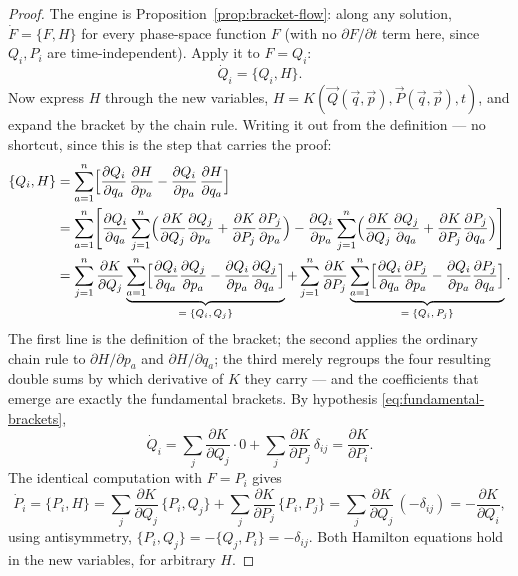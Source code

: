 \documentclass[11pt]{article}
\theoremstyle{plain}
\theoremstyle{definition}
\theoremstyle{remark}
\newcommand{\pd}[2]{\frac{\partial #1}{\partial #2}}
\newcommand{\vq}{\vec{q}}
\newcommand{\vp}{\vec{p}}
\newcommand{\vQ}{\vec{Q}}
\newcommand{\vP}{\vec{P}}
\begin{document}
\begin{proof}
The engine is Proposition~\ref{prop:bracket-flow}: along any solution,
$\dot F = \{F, H\}$ for every phase-space function $F$ (with no
$\partial F/\partial t$ term here, since $Q_i, P_i$ are
time-independent). Apply it to $F = Q_i$:
\begin{equation}
  \dot Q_i = \{Q_i, H\} .
\end{equation}
Now express $H$ through the new variables, $H = K(\vQ(\vq,\vp),
\vP(\vq,\vp), t)$, and expand the bracket by the chain rule. Writing it
out from the definition --- no shortcut, since this is the step that
carries the proof:
\begin{align}
  \{Q_i, H\}
  &= \sum_{a=1}^{n}\Bigl[
      \pd{Q_i}{q_a}\,\pd{H}{p_a}
    - \pd{Q_i}{p_a}\,\pd{H}{q_a}
    \Bigr] \nonumber\\
  &= \sum_{a=1}^{n}\Biggl[
      \pd{Q_i}{q_a}
      \sum_{j=1}^{n}\Bigl(\pd{K}{Q_j}\pd{Q_j}{p_a}
                        + \pd{K}{P_j}\pd{P_j}{p_a}\Bigr)
    - \pd{Q_i}{p_a}
      \sum_{j=1}^{n}\Bigl(\pd{K}{Q_j}\pd{Q_j}{q_a}
                        + \pd{K}{P_j}\pd{P_j}{q_a}\Bigr)
    \Biggr] \nonumber\\
  &= \sum_{j=1}^{n}\pd{K}{Q_j}
     \underbrace{\sum_{a=1}^{n}\Bigl[
       \pd{Q_i}{q_a}\pd{Q_j}{p_a} - \pd{Q_i}{p_a}\pd{Q_j}{q_a}
     \Bigr]}_{=\;\{Q_i,\,Q_j\}}
   + \sum_{j=1}^{n}\pd{K}{P_j}
     \underbrace{\sum_{a=1}^{n}\Bigl[
       \pd{Q_i}{q_a}\pd{P_j}{p_a} - \pd{Q_i}{p_a}\pd{P_j}{q_a}
     \Bigr]}_{=\;\{Q_i,\,P_j\}} .
  \label{eq:bracket-chain}
\end{align}
The first line is the definition of the bracket; the second applies the
ordinary chain rule to $\partial H/\partial p_a$ and
$\partial H/\partial q_a$; the third merely regroups the four resulting
double sums by which derivative of $K$ they carry --- and the
coefficients that emerge are exactly the fundamental brackets. By
hypothesis \eqref{eq:fundamental-brackets},
\begin{equation}
  \dot Q_i = \sum_j \pd{K}{Q_j}\cdot 0 + \sum_j \pd{K}{P_j}\,\delta_{ij}
  = \pd{K}{P_i} .
\end{equation}
The identical computation with $F = P_i$ gives
\begin{equation}
  \dot P_i = \{P_i, H\}
  = \sum_j \pd{K}{Q_j}\,\{P_i, Q_j\} + \sum_j \pd{K}{P_j}\,\{P_i, P_j\}
  = \sum_j \pd{K}{Q_j}\,(-\delta_{ij})
  = -\pd{K}{Q_i} ,
\end{equation}
using antisymmetry, $\{P_i, Q_j\} = -\{Q_j, P_i\} = -\delta_{ij}$.
Both Hamilton equations hold in the new variables, for arbitrary $H$.
\end{proof}
\end{document}
